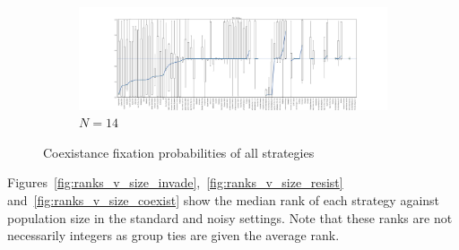 \documentclass{article}
\begin{document}
\begin{figure}[!hbtp]
    \begin{subfigure}[t]{\textwidth}
        \centering
        \includegraphics[width=\textwidth]{../img/boxplot_14_coexist.pdf}
        \caption{\(N=14\)}
    \end{subfigure}%
    \caption{Coexistance fixation probabilities of all strategies}
    \label{fig:coexistance_boxplot_std}
\end{figure}


Figures~\ref{fig:ranks_v_size_invade},~\ref{fig:ranks_v_size_resist}
and~\ref{fig:ranks_v_size_coexist} show the median rank of each strategy against
population size in the standard and noisy settings. Note that these ranks are
not necessarily integers as group ties are given the average rank.
\end{document}
